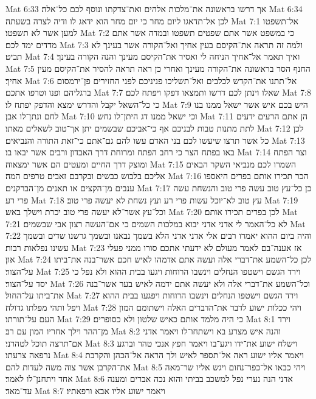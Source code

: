 Mat 6:33  אך דרשו בראשונה את־מלכות אלהים ואת־צדקתו ונוסף לכם כל־אלה׃
Mat 6:34  לכן אל־תדאגו ליום מחר כי יום מחר הוא ידאג לו ודיה לצרה בשעתה׃
Mat 7:1  אל־תשפטו למען אשר לא תשפטו׃
Mat 7:2  כי במשפט אשר אתם שפטים תשפטו ובמדה אשר אתם מדדים ימד לכם׃
Mat 7:3  ולמה זה תראה את־הקיסם בעין אחיך ואל־הקורה אשר בעינך לא תביט׃
Mat 7:4  ואיך תאמר אל־אחיך הניחה לי ואסיר את־הקיסם מעינך והנה הקורה בעינך׃
Mat 7:5  החנף הסר בראשונה את־הקורה מעינך ואחרי כן ראה תראה להסיר את־הקיסם מעין אחיך׃
Mat 7:6  אל־תתנו את־הקדש לכלבים ואל־תשליכו פניניכם לפני החזירים פן־ירמסום ברגליהם ופנו וטרפו אתכם׃
Mat 7:7  שאלו וינתן לכם דרשו ותמצאו דפקו ויפתח לכם׃
Mat 7:8  כי כל־השאל יקבל והדרש ימצא והדפק יפתח לו׃
Mat 7:9  היש בכם איש אשר ישאל ממנו בנו לחם ונתן־לו אבן׃
Mat 7:10  וכי ישאל ממנו דג היתן־לו נחש׃
Mat 7:11  הן אתם הרעים ידעים לתת מתנות טבות לבניכם אף כי־אביכם שבשמים יתן אך־טוב לשאלים מאתו׃
Mat 7:12  לכן כל אשר תרצו שיעשו לכם בני האדם עשו להם גם־אתם כי־זאת התורה והנביאים׃
Mat 7:13  באו בפתח הצר כי רחב הפתח ומרוחת דרך האבדון ורבים אשר יבאו בו׃
Mat 7:14  וצר הפתח ומוצק דרך החיים ומעטים הם אשר ימצאוה׃
Mat 7:15  השמרו לכם מנביאי השקר הבאים אליכם בלבוש כבשים ובקרבם זאבים טרפים המה׃
Mat 7:16  הכר תכירו אותם בפרים היאספו ענבים מן־הקצים או תאנים מן־הברקנים׃
Mat 7:17  כן כל־עץ טוב עשה פרי טוב והנשחת עשה פרי רע׃
Mat 7:18  עץ טוב לא־יוכל עשות פרי רע ועץ נשחת לא יעשה פרי טוב׃
Mat 7:19  וכל־עץ אשר־לא יעשה פרי טוב יכרת וישלך באש׃
Mat 7:20  לכן בפרים תכירו אותם׃
Mat 7:21  לא כל־האמר לי אדני אדני יבוא במלכות השמים כי אם־העשה רצון אבי שבשמים׃
Mat 7:22  והיה ביום ההוא יאמרו רבים אלי אדני אדני הלא בשמך נבאנו ובשמך גרשנו שדים ובשמך עשינו נפלאות רבות׃
Mat 7:23  אז אענה־בם לאמר מעולם לא ידעתי אתכם סורו ממני פעלי און׃
Mat 7:24  לכן כל־השמע את־דברי אלה ועשה אתם אדמהו לאיש חכם אשר־בנה את־ביתו על־הצור׃
Mat 7:25  וירד הגשם וישטפו הנחלים וינשבו הרוחות ויגעו בבית ההוא ולא נפל כי יסד על־הצור׃
Mat 7:26  וכל־השמע את־דברי אלה ולא יעשה אתם ידמה לאיש בער אשר־בנה את־ביתו על־החול׃
Mat 7:27  וירד הגשם וישטפו הנחלים וינשבו הרוחות ויפגעו בבית ההוא ויפל ותהי מפלתו גדולה׃
Mat 7:28  ויהי ככלות ישוע לדבר את־הדברים האלה וישתומם המון העם על־תורתו׃
Mat 7:29  כי היה מלמד אותם כאיש שלטון ולא כסופרים׃
Mat 8:1  וירד מן־ההר וילך אחריו המון עם רב׃
Mat 8:2  והנה איש מצרע בא וישתחו־לו ויאמר אדני אם־תרצה תוכל לטהרני׃
Mat 8:3  וישלח ישוע את־ידו ויגע־בו ויאמר חפץ אנכי טהר וברגע נרפאה צרעתו׃
Mat 8:4  ויאמר אליו ישוע ראה אל־תספר לאיש ולך הראה אל־הכהן והקרבת את־הקרבן אשר צוה משה לעדות להם׃
Mat 8:5  ויהי כבאו אל־כפר־נחום ויגש אליו שר־מאה אחד ויתחנן־לו לאמר׃
Mat 8:6  אדני הנה נערי נפל למשכב בביתי והוא נכה אברים ומענה עד־מאד׃
Mat 8:7  ויאמר ישוע אליו אבא ורפאתיו׃
